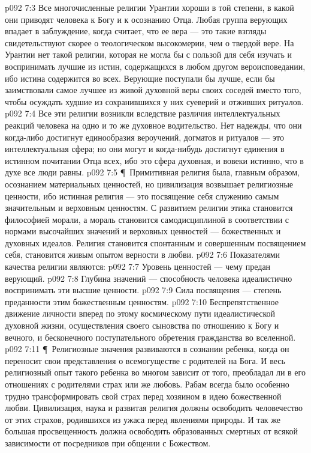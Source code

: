 \vs p092 7:3 Все многочисленные религии Урантии хороши в той степени, в какой они приводят человека к Богу и к осознанию Отца. Любая группа верующих впадает в заблуждение, когда считает, что ее вера --- это  такие взгляды свидетельствуют скорее о теологическом высокомерии, чем о твердой вере. На Урантии нет такой религии, которая не могла бы с пользой для себя изучать и воспринимать лучшие из истин, содержащихся в любом другом вероисповедании, ибо истина содержится во всех. Верующие поступали бы лучше, если бы заимствовали самое лучшее из живой духовной веры своих соседей вместо того, чтобы осуждать худшие из сохранившихся у них суеверий и отживших ритуалов.
\vs p092 7:4 Все эти религии возникли вследствие различия интеллектуальных реакций человека на одно и то же духовное водительство. Нет надежды, что они когда\hyp{}либо достигнут единообразия вероучений, догматов и ритуалов --- это интеллектуальная сфера; но они могут и когда\hyp{}нибудь достигнут единения в истинном почитании Отца всех, ибо это сфера духовная, и вовеки истинно, что в духе все люди равны.
\vs p092 7:5 \P\ Примитивная религия была, главным образом, осознанием материальных ценностей, но цивилизация возвышает религиозные ценности, ибо истинная религия --- это посвящение себя служению самым значительным и верховным ценностям. С развитием религии этика становится философией морали, а мораль становится самодисциплиной в соответствии с нормами высочайших значений и верховных ценностей --- божественных и духовных идеалов. Религия становится спонтанным и совершенным посвящением себя, становится живым опытом верности в любви.
\vs p092 7:6 Показателями качества религии являются:
\vs p092 7:7 \bibnobreakspace Уровень ценностей --- чему предан верующий.
\vs p092 7:8 \bibnobreakspace Глубина значений --- способность человека идеалистично воспринимать эти высшие ценности.
\vs p092 7:9 \bibnobreakspace Сила посвящения --- степень преданности этим божественным ценностям.
\vs p092 7:10 \bibnobreakspace Беспрепятственное движение личности вперед по этому космическому пути идеалистической духовной жизни, осуществления своего сыновства по отношению к Богу и вечного, и бесконечного поступательного обретения гражданства во вселенной.
\vs p092 7:11 \P\ Религиозные значения развиваются в сознании ребенка, когда он переносит свои представления о всемогуществе с родителей на Бога. И весь религиозный опыт такого ребенка во многом зависит от того, преобладал ли в его отношениях с родителями страх или же любовь. Рабам всегда было особенно трудно трансформировать свой страх перед хозяином в идею божественной любви. Цивилизация, наука и развитая религия должны освободить человечество от этих страхов, родившихся из ужаса перед явлениями природы. И так же большая просвещенность должна освободить образованных смертных от всякой зависимости от посредников при общении с Божеством.
